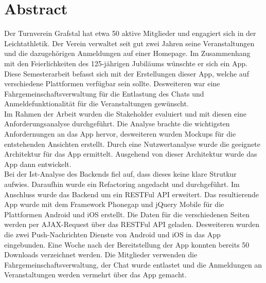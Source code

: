 %
%

\thispagestyle{empty}



\newpage
\thispagestyle{empty}
\chapter*{Abstract}\label{abstract}
Der Turnverein Grafstal hat etwa 50 aktive Mitglieder und engagiert sich in der Leichtathletik. Der Verein verwaltet seit gut zwei Jahren seine Veranstaltungen und die dazugehörigen Anmeldungen auf einer Homepage. Im Zusammenhang mit den Feierlichkeiten des 125-jährigen Jubiläums wünschte er sich ein App.\\

Diese Semesterarbeit befasst sich mit der Erstellungen dieser App, welche auf verschiedene Plattformen verfügbar sein sollte. Desweiteren war eine Fahrgemeinschaftsverwaltung für die Entlastung des Chats und Anmeldefunktionalität für die Veranstaltungen gewünscht.\\

Im Rahmen der Arbeit wurden die Stakeholder evaluiert und mit diesen eine Anforderungsanalyse durchgeführt. Die Analyse brachte die wichtigsten Anfordernungen an das App hervor, desweiteren wurden Mockups für die entstehenden Ansichten erstellt. Durch eine Nutzwertanalyse wurde die geeignete Architektur für das App ermittelt. Ausgehend von dieser Architektur wurde das App dann entwickelt.\\

Bei der Ist-Analyse des Backends fiel auf, dass dieses keine klare Strutkur aufwies. Daraufhin wurde ein Refactoring angedacht und durchgeführt. Im Anschluss wurde das Backend um ein RESTFul API erweitert. Das resultierende App wurde mit dem Framework Phonegap und jQuery Mobile für die Plattformen Android und iOS erstellt. Die Daten für die verschiedenen Seiten werden per AJAX-Request über das RESTFul API geladen. Desweiteren wurden die zwei Push-Nachrichten Dienste von Android und iOS in das App eingebunden. Eine Woche nach der Bereitstellung der App konnten bereits 50 Downloads verzeichnet werden. Die Mitglieder verwenden die Fahrgemeinschaftsverwaltung, der Chat wurde entlastet und die Anmeldungen an Veranstaltungen werden vermehrt über das App gemacht.

